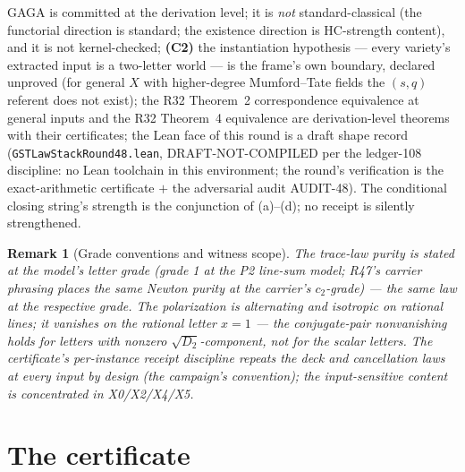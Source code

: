 \documentclass[11pt]{article}
\newtheorem{remark}[theorem]{Remark}
\begin{document}
\begin{enumerate}[label=(\alph*)]
GAGA is committed at the derivation level; it is \emph{not}
standard-classical (the functorial direction is standard; the
existence direction is HC-strength content), and it is not
kernel-checked; \textbf{(C2)} the instantiation hypothesis --- every
variety's extracted input is a two-letter world --- is the frame's
own boundary, declared unproved (for general $X$ with higher-degree
Mumford--Tate fields the $(s,q)$ referent does not exist); the R32
Theorem~2 correspondence
equivalence at general inputs and the R32 Theorem~4 equivalence are
derivation-level theorems with their certificates; the Lean face of
this round is a draft shape record
(\texttt{GSTLawStackRound48.lean}, DRAFT-NOT-COMPILED per the
ledger-108 discipline: no Lean toolchain in this environment; the
round's verification is the exact-arithmetic certificate $+$ the
adversarial audit AUDIT-48). The conditional closing string's
strength is the
conjunction of (a)--(d); no receipt is silently strengthened.
\end{enumerate}

\begin{remark}[Grade conventions and witness scope]
The trace-law purity is stated at the model's letter grade (grade 1
at the P2 line-sum model; R47's carrier phrasing places the same
Newton purity at the carrier's $c_2$-grade) --- the same law at the
respective grade. The polarization is alternating and isotropic on
rational lines; it vanishes on the rational letter $x=1$ --- the
conjugate-pair nonvanishing holds for letters with nonzero
$\sqrt{D_2}$-component, not for the scalar letters. The certificate's
per-instance receipt discipline repeats the deck and cancellation
laws at every input by design (the campaign's convention); the
input-sensitive content is concentrated in X0/X2/X4/X5.
\end{remark}

\section{The certificate}
\end{document}
